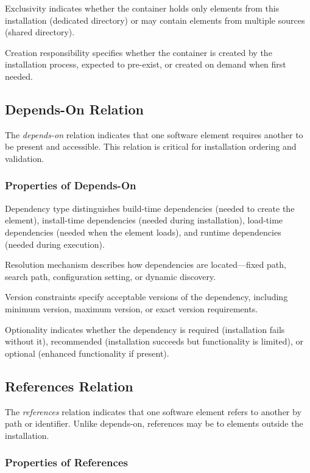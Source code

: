 \documentclass[11pt]{article}
\begin{document}
Exclusivity indicates whether the container holds only elements from this installation (dedicated directory) or may contain elements from multiple sources (shared directory).

Creation responsibility specifies whether the container is created by the installation process, expected to pre-exist, or created on demand when first needed.

\subsection{Depends-On Relation}

The \textit{depends-on} relation indicates that one software element requires another to be present and accessible. This relation is critical for installation ordering and validation.

\subsubsection{Properties of Depends-On}

Dependency type distinguishes build-time dependencies (needed to create the element), install-time dependencies (needed during installation), load-time dependencies (needed when the element loads), and runtime dependencies (needed during execution).

Resolution mechanism describes how dependencies are located---fixed path, search path, configuration setting, or dynamic discovery.

Version constraints specify acceptable versions of the dependency, including minimum version, maximum version, or exact version requirements.

Optionality indicates whether the dependency is required (installation fails without it), recommended (installation succeeds but functionality is limited), or optional (enhanced functionality if present).

\subsection{References Relation}

The \textit{references} relation indicates that one software element refers to another by path or identifier. Unlike depends-on, references may be to elements outside the installation.

\subsubsection{Properties of References}
\end{document}
